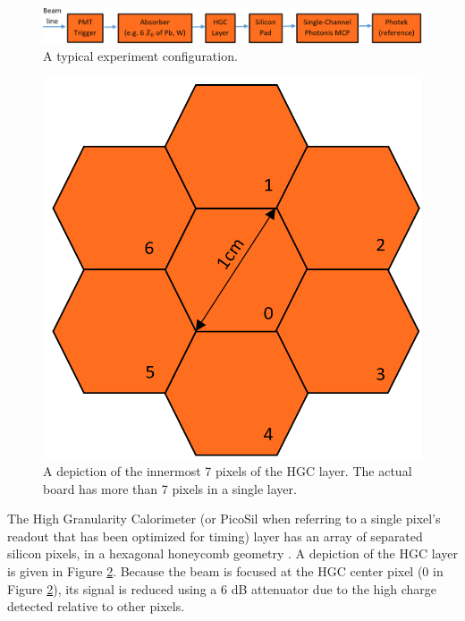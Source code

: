 \documentclass[12pt]{article}
\begin{document}
\begin{figure}[h]
	\centering
	\includegraphics[width=\linewidth]{setup.png}
	\caption{A typical experiment configuration.}
	\label{fig:setup}
\end{figure}

\begin{figure}[h]
\centering
\begin{minipage}[t]{.5\textwidth}
	\centering
	\includegraphics[scale=0.5]{HGC.png}
	\caption{A depiction of the innermost 7 pixels of the HGC layer. 
	The actual board has more than 7 pixels in a single layer.}
	\label{fig:HGC}
\end{minipage}
\end{figure}

The High Granularity Calorimeter (or PicoSil when referring to a single pixel’s readout that has been optimized for timing) layer has an array of separated silicon pixels, in a hexagonal honeycomb geometry \cite{P2}. 
A depiction of the HGC layer is given in Figure \ref{fig:HGC}. 
Because the beam is focused at the HGC center pixel (0 in Figure \ref{fig:HGC}), its signal is reduced using a 6 dB attenuator due to the high charge detected relative to other pixels. 
\end{document}
